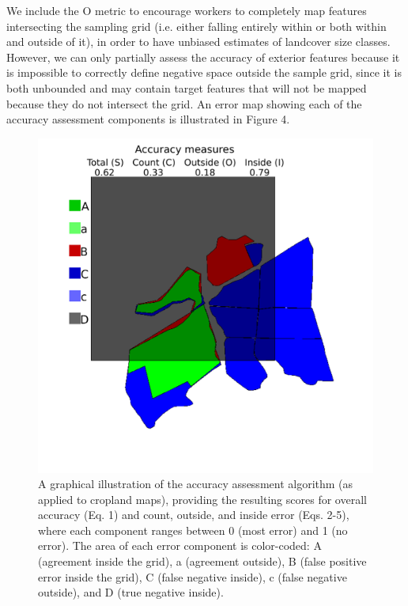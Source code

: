 \documentclass[preprint,12pt,authoryear]{elsarticle}
\begin{document}
We include the O metric to encourage workers to completely map features intersecting the sampling grid (i.e. either falling entirely within or both within and outside of it), in order to have unbiased estimates of landcover size classes. However, we can only partially assess the accuracy of exterior features because it is impossible to correctly define negative space outside the sample grid, since it is both unbounded and may contain target features that will not be mapped because they do not intersect the grid. An error map showing each of the accuracy assessment components is illustrated in Figure 4.

\begin{figure}[!ht]
  \begin{center}
    \includegraphics[scale=0.8]{figures/fig4.pdf}
    \caption{A graphical illustration of the accuracy assessment algorithm (as applied to cropland maps), providing the resulting scores for overall accuracy (Eq. 1) and count, outside, and inside error (Eqs. 2-5), where each component ranges between 0 (most error) and 1 (no error). The area of each error component is color-coded: A (agreement inside the grid), a (agreement outside), B (false positive error inside the grid), C (false negative inside), c (false negative outside), and D (true negative inside). }
    \label{default}
  \end{center}
\end{figure}
\end{document}
